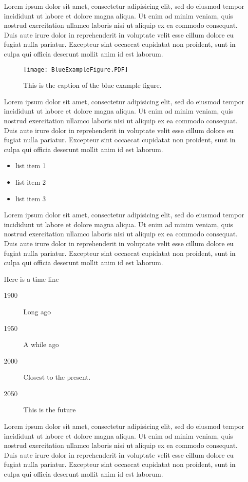 Lorem ipsum dolor sit amet, consectetur adipisicing elit, sed do eiusmod tempor incididunt ut labore et dolore magna aliqua. Ut enim ad minim veniam, quis nostrud exercitation ullamco laboris nisi ut aliquip ex ea commodo consequat. Duis aute irure dolor in reprehenderit in voluptate velit esse cillum dolore eu fugiat nulla pariatur. Excepteur sint occaecat cupidatat non proident, sunt in culpa qui officia deserunt mollit anim id est laborum.

\begin{figure}
	\center
	\texttt{[image: BlueExampleFigure.PDF]}
	\caption[Blue Example]{This is the caption of the blue example figure.}
	\label{fig:blue}
\end{figure}

Lorem ipsum dolor sit amet, consectetur adipisicing elit, sed do eiusmod tempor incididunt ut labore et dolore magna aliqua. Ut enim ad minim veniam, quis nostrud exercitation ullamco laboris nisi ut aliquip ex ea commodo consequat. Duis aute irure dolor in reprehenderit in voluptate velit esse cillum dolore eu fugiat nulla pariatur. Excepteur sint occaecat cupidatat non proident, sunt in culpa qui officia deserunt mollit anim id est laborum.

\begin{itemize}
	\item list item 1
	\item list item 2
	\item list item 3
\end{itemize}

Lorem ipsum dolor sit amet, consectetur adipisicing elit, sed do eiusmod tempor incididunt ut labore et dolore magna aliqua. Ut enim ad minim veniam, quis nostrud exercitation ullamco laboris nisi ut aliquip ex ea commodo consequat. Duis aute irure dolor in reprehenderit in voluptate velit esse cillum dolore eu fugiat nulla pariatur. Excepteur sint occaecat cupidatat non proident, sunt in culpa qui officia deserunt mollit anim id est laborum.

Here is a time line
\begin{description}
	\item[1900] Long ago
	\item[1950] A while ago
	\item[2000] Closest to the present.
	\item[2050] This is the future
\end{description}

Lorem ipsum dolor sit amet, consectetur adipisicing elit, sed do eiusmod tempor incididunt ut labore et dolore magna aliqua. Ut enim ad minim veniam, quis nostrud exercitation ullamco laboris nisi ut aliquip ex ea commodo consequat. Duis aute irure dolor in reprehenderit in voluptate velit esse cillum dolore eu fugiat nulla pariatur. Excepteur sint occaecat cupidatat non proident, sunt in culpa qui officia deserunt mollit anim id est laborum.

